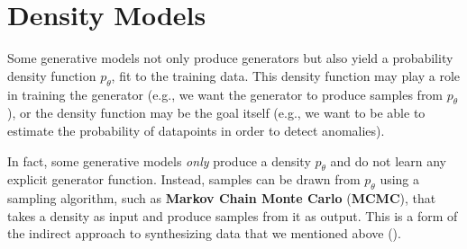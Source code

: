 
\section{Density Models}
Some generative models not only produce generators but also yield a probability density function $p_{\theta}$, fit to the training data. This density function may play a role in training the generator (e.g., we want the generator to produce samples from $p_{\theta}$), or the density function may be the goal itself (e.g., we want to be able to estimate the probability of datapoints in order to detect anomalies).

In fact, some generative models \textit{only} produce a density $p_{\theta}$ and do not learn any explicit generator function. Instead, samples can be drawn from $p_{\theta}$ using a sampling algorithm, such as \textbf{Markov Chain Monte Carlo} (\textbf{MCMC}), that takes a density as input and produce samples from it as output. This is a form of the indirect approach to synthesizing data that we mentioned above (\fig{\ref{fig:generative_models:gen_model_training_vs_sampling_indirect}}).


